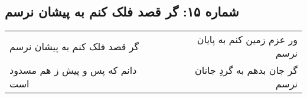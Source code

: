 \begin{center}
\section*{شماره ۱۵: گر قصد فلک کنم به پیشان نرسم}
\label{sec:015}
\begin{longtable}{l p{0.5cm} r}
گر قصد فلک کنم به پیشان نرسم
&&
ور عزم زمین کنم به پایان نرسم
\\
دانم که پس و پیش ز هم مسدود است
&&
گر جان بدهم به گردِ جانان نرسم
\\
\end{longtable}
\end{center}
